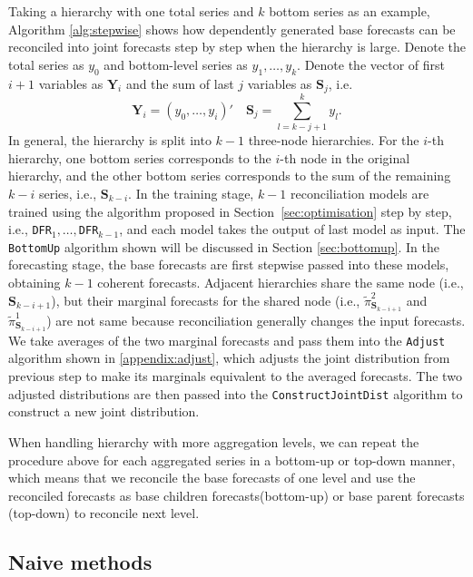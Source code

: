 \documentclass[a4paper,review,12pt,authoryear]{elsarticle}
\let\code=\texttt
\newcommand{\bY}{\mathbf{Y}}
\begin{document}
    Taking a hierarchy with one total series and $k$ bottom series as an example, Algorithm \ref{alg:stepwise} shows how dependently generated base forecasts can be reconciled into joint forecasts step by step when the hierarchy is large. 
    Denote the total series as $y_0$ and bottom-level series as $y_1, \dots, y_k$. 
    Denote the vector of first $i+1$ variables as $\mathbf{Y}_i$ and the sum of last $j$ variables as $\mathbf{S}_j$, i.e.
    \[
     \bY_i = (y_0, \dots, y_i)' \quad \mathbf{S}_j = \sum_{l=k-j+1}^{k} y_l.
    \] 
    In general, the hierarchy is split into $k-1$ three-node hierarchies.  
    For the $i$-th hierarchy, one bottom series corresponds to the $i$-th node in the original hierarchy, and the other bottom series corresponds to the sum of the remaining $k-i$ series, i.e., $\mathbf{S}_{k-i}$.
    In the training stage, $k-1$ reconciliation models are trained using the algorithm proposed in Section~\ref{sec:optimisation} step by step, i.e., \code{DFR}$_1,\dots,$\code{DFR}$_{k-1}$, and each model takes the output of last model as input.
    The \code{BottomUp} algorithm shown will be discussed in Section \ref{sec:bottomup}.
    In the forecasting stage, the base forecasts are first stepwise passed into these models, obtaining $k-1$ coherent forecasts.
    Adjacent hierarchies share the same node (i.e., $\mathbf{S}_{k-i+1}$), but their marginal forecasts for the shared node (i.e., $\tilde\pi^{2}_{\mathbf{S}_{k-i+1}}$ and $\tilde\pi^{1}_{\mathbf{S}_{k-i+1}}$) are not same because reconciliation generally changes the input forecasts.
    We take averages of the two marginal forecasts and pass them into the \code{Adjust} algorithm shown in \ref{appendix:adjust}, which adjusts the joint distribution from previous step to make its marginals equivalent to the averaged forecasts.
    The two adjusted distributions are then passed into the \code{ConstructJointDist} algorithm to construct a new joint distribution.
  
     When handling hierarchy with more aggregation levels, we can repeat the procedure above for each aggregated series in a bottom-up or top-down manner, which means that we reconcile the base forecasts of one level and use the reconciled forecasts as base children forecasts(bottom-up) or base parent forecasts (top-down) to reconcile next level.
  
     \subsection{Naive methods}
  
\end{document}
